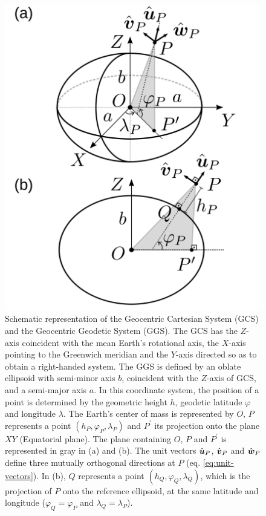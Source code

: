 \documentclass[extra]{gji}
\begin{document}
\begin{figure}
    \includegraphics{figures/cartesian-geodetic-systems.png}
    \caption{Schematic representation of the Geocentric Cartesian System (GCS) and the Geocentric Geodetic System (GGS). The GCS has the $Z$-axis coincident with the mean Earth's rotational axis,
    the $X$-axis pointing to the Greenwich meridian and the $Y$-axis
    directed so as to obtain a right-handed system. The GGS is      defined by an oblate ellipsoid with semi-minor axis $b$,
    coincident with the $Z$-axis of GCS, and a semi-major
    axis $a$. In this coordinate system, the position of a point is
    determined by the geometric height $h$, geodetic latitude
    $\varphi$ and longitude $\lambda$.
    The Earth's center of mass is represented
    by $O$, $P$ represents a point $(h_{P}, \varphi_{P}, \lambda_{P})$ and $P^{\prime}$ its projection onto the plane $XY$
    (Equatorial plane). The plane containing $O$, $P$ and
    $P^{\prime}$ is represented in gray in (a) and (b).
    The unit vectors $\hat{\mitbf{u}}_{P}$, $\hat{\mitbf{v}}_{P}$ and
    $\hat{\mitbf{w}}_{P}$ define three mutually orthogonal
    directions at $P$ (eq. \ref{eq:unit-vectors}).
    In (b), $Q$ represents a point $(h_{Q}, \varphi_{Q}, \lambda_{Q})$,
    which is the projection of $P$ onto the reference ellipsoid, at
    the same latitude and longitude ($\varphi_{Q} = \varphi_{P}$ and $\lambda_{Q} = \lambda_{P}$).}
  \label{fig:GCS-GGS}
\end{figure}
\end{document}
